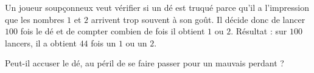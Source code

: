 
\begin{exercice}\label{exosmath-0440}

    Un joueur soupçonneux veut vérifier si un dé est truqué parce qu'il a l'impression que les nombres \( 1\) et \( 2\) arrivent trop souvent à son goût. Il décide donc de lancer \( 100\) fois le dé et de compter combien de fois il obtient \( 1\) ou \( 2\). Résultat : sur \( 100\) lancers, il a obtient \( 44\) fois un $1$ ou un \(2 \).

    Peut-il accuser le dé, au péril de se faire passer pour un mauvais perdant ?

\end{exercice}
